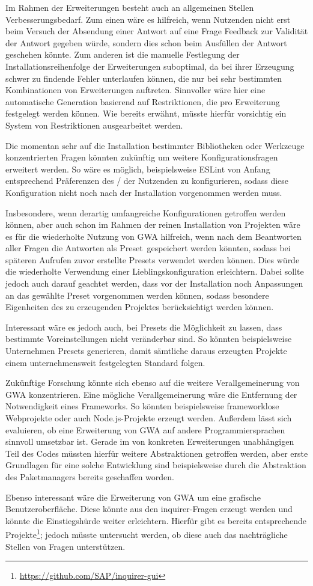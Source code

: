 Im Rahmen der Erweiterungen besteht auch an allgemeinen Stellen Verbesserungsbedarf. Zum einen wäre es hilfreich, wenn Nutzenden nicht erst beim Versuch der Absendung einer Antwort auf eine Frage Feedback zur Validität der Antwort gegeben würde, sondern dies schon beim Ausfüllen der Antwort geschehen könnte. Zum anderen ist die manuelle Festlegung der Installationsreihenfolge der Erweiterungen suboptimal, da bei ihrer Erzeugung schwer zu findende Fehler unterlaufen können, die nur bei sehr bestimmten Kombinationen von Erweiterungen auftreten. Sinnvoller wäre hier eine automatische Generation basierend auf Restriktionen, die pro Erweiterung festgelegt werden können. Wie bereits erwähnt, müsste hierfür vorsichtig ein System von Restriktionen ausgearbeitet werden.

Die momentan sehr auf die Installation bestimmter Bibliotheken oder Werkzeuge konzentrierten Fragen könnten zukünftig um weitere Konfigurationsfragen erweitert werden. So wäre es möglich, beispielsweise ESLint von Anfang entsprechend Präferenzen des / der Nutzenden zu konfigurieren, sodass diese Konfiguration nicht noch nach der Installation vorgenommen werden muss.

Insbesondere, wenn derartig umfangreiche Konfigurationen getroffen werden können, aber auch schon im Rahmen der reinen Installation von Projekten wäre es für die wiederholte Nutzung von \gls{GWA} hilfreich, wenn nach dem Beantworten aller Fragen die Antworten als \glqq Preset\grqq\ gespeichert werden könnten, sodass bei späteren Aufrufen zuvor erstellte Presets verwendet werden können. Dies würde die wiederholte Verwendung einer Lieblingskonfiguration erleichtern. Dabei sollte jedoch auch darauf geachtet werden, dass vor der Installation noch Anpassungen an das gewählte Preset vorgenommen werden können, sodass besondere Eigenheiten des zu erzeugenden Projektes berücksichtigt werden können.

Interessant wäre es jedoch auch, bei Presets die Möglichkeit zu lassen, dass bestimmte Voreinstellungen nicht veränderbar sind. So könnten beispielsweise Unternehmen Presets generieren, damit sämtliche daraus erzeugten Projekte einem unternehmensweit festgelegten Standard folgen.

Zukünftige Forschung könnte sich ebenso auf die weitere Verallgemeinerung von \gls{GWA} konzentrieren. Eine mögliche Verallgemeinerung wäre die Entfernung der Notwendigkeit eines Frameworks. So könnten beispielsweise frameworklose Webprojekte oder auch Node.js-Projekte erzeugt werden. Außerdem lässt sich evaluieren, ob eine Erweiterung von \gls{GWA} auf andere Programmiersprachen sinnvoll umsetzbar ist. Gerade im von konkreten Erweiterungen unabhängigen Teil des Codes müssten hierfür weitere Abstraktionen getroffen werden, aber erste Grundlagen für eine solche Entwicklung sind beispielsweise durch die Abstraktion des Paketmanagers bereits geschaffen worden.

Ebenso interessant wäre die Erweiterung von \gls{GWA} um eine grafische Benutzeroberfläche. Diese könnte aus den inquirer-Fragen erzeugt werden und könnte die Einstiegshürde weiter erleichtern. Hierfür gibt es bereits entsprechende Projekte\footnote{\url{https://github.com/SAP/inquirer-gui}}; jedoch müsste untersucht werden, ob diese auch das nachträgliche Stellen von Fragen unterstützen.